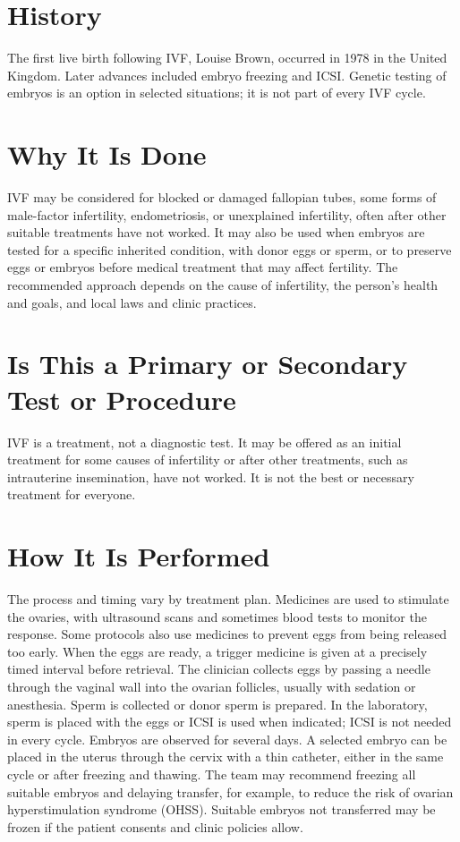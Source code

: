 \section*{History}
The first live birth following IVF, Louise Brown, occurred in 1978 in the United Kingdom. Later advances included embryo freezing and ICSI. Genetic testing of embryos is an option in selected situations; it is not part of every IVF cycle.

\section*{Why It Is Done}
IVF may be considered for blocked or damaged fallopian tubes, some forms of male-factor infertility, endometriosis, or unexplained infertility, often after other suitable treatments have not worked. It may also be used when embryos are tested for a specific inherited condition, with donor eggs or sperm, or to preserve eggs or embryos before medical treatment that may affect fertility. The recommended approach depends on the cause of infertility, the person's health and goals, and local laws and clinic practices.

\section*{Is This a Primary or Secondary Test or Procedure}
IVF is a treatment, not a diagnostic test. It may be offered as an initial treatment for some causes of infertility or after other treatments, such as intrauterine insemination, have not worked. It is not the best or necessary treatment for everyone.

\section*{How It Is Performed}
The process and timing vary by treatment plan. Medicines are used to stimulate the ovaries, with ultrasound scans and sometimes blood tests to monitor the response. Some protocols also use medicines to prevent eggs from being released too early. When the eggs are ready, a trigger medicine is given at a precisely timed interval before retrieval. The clinician collects eggs by passing a needle through the vaginal wall into the ovarian follicles, usually with sedation or anesthesia. Sperm is collected or donor sperm is prepared. In the laboratory, sperm is placed with the eggs or ICSI is used when indicated; ICSI is not needed in every cycle. Embryos are observed for several days. A selected embryo can be placed in the uterus through the cervix with a thin catheter, either in the same cycle or after freezing and thawing. The team may recommend freezing all suitable embryos and delaying transfer, for example, to reduce the risk of ovarian hyperstimulation syndrome (OHSS). Suitable embryos not transferred may be frozen if the patient consents and clinic policies allow.

